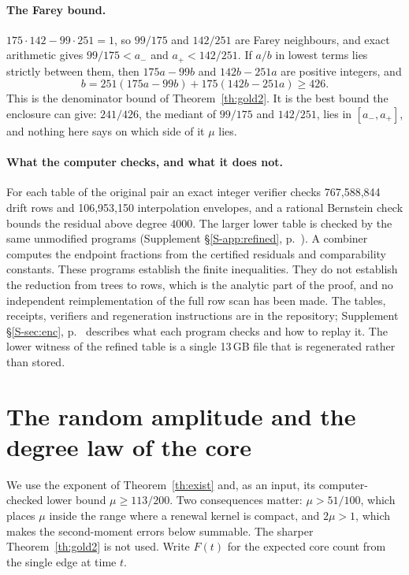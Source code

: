 \documentclass[11pt]{article}
\theoremstyle{remark}
\newcommand{\Sref}[1]{Supplement \S\ref{S-#1}, p.~\pageref{S-#1}}
\begin{document}
\paragraph{The Farey bound.} $175\cdot142-99\cdot251=1$, so $99/175$ and $142/251$ are Farey neighbours, and exact arithmetic gives $99/175<a_-$ and $a_+<142/251$. If $a/b$ in lowest terms lies strictly between them, then $175a-99b$ and $142b-251a$ are positive integers, and
\[
 b=251(175a-99b)+175(142b-251a)\ge 426 .
\]
This is the denominator bound of Theorem~\ref{th:gold2}. It is the best bound the enclosure can give: $241/426$, the mediant of $99/175$ and $142/251$, lies in $[a_-,a_+]$, and nothing here says on which side of it $\mu$ lies.

\paragraph{What the computer checks, and what it does not.} For each table of the original pair an exact integer verifier checks 767,588,844 drift rows and 106,953,150 interpolation envelopes, and a rational Bernstein check bounds the residual above degree $4000$. The larger lower table is checked by the same unmodified programs (\Sref{app:refined}). A combiner computes the endpoint fractions from the certified residuals and comparability constants. These programs establish the finite inequalities. They do not establish the reduction from trees to rows, which is the analytic part of the proof, and no independent reimplementation of the full row scan has been made. The tables, receipts, verifiers and regeneration instructions are in the repository; \Sref{sec:enc} describes what each program checks and how to replay it. The lower witness of the refined table is a single 13\,GB file that is regenerated rather than stored.

\section{The random amplitude and the degree law of the core}\label{sec:core}
We use the exponent of Theorem~\ref{th:exist} and, as an input, its computer-checked lower bound $\mu\ge113/200$. Two consequences matter: $\mu>51/100$, which places $\mu$ inside the range where a renewal kernel is compact, and $2\mu>1$, which makes the second-moment errors below summable. The sharper Theorem~\ref{th:gold2} is not used. Write $F(t)$ for the expected core count from the single edge at time $t$.
\end{document}
